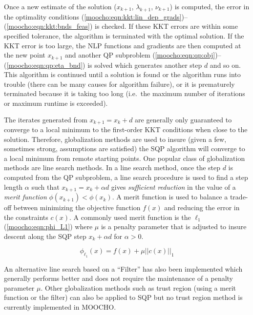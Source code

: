 \documentclass[pdf,12pt,report]{SANDreport}
\begin{document}
Once a new estimate of the solution ($x_{k+1}$, $\lambda_{k+1}$, $\nu_{k+1}$)
is computed, the error in the optimality conditions
(\ref{moocho:eqn:kkt:lin_dep_grads})--(\ref{moocho:eqn:kkt:bnds_feas}) is
checked.  If these KKT errors are within some specified tolerance, the
algorithm is terminated with the optimal solution.  If the KKT error is too
large, the NLP functions and gradients are then computed at the new point
$x_{k+1}$ and another QP subproblem
(\ref{moocho:eqn:qp:obj})--(\ref{moocho:eqn:qp:eta_bnd}) is solved which
generates another step $d$ and so on.  This algorithm is continued until a
solution is found or the algorithm runs into trouble (there can be many causes
for algorithm failure), or it is prematurely terminated because it is taking
too long (i.e.\ the maximum number of iterations or maximum runtime is
exceeded).

The iterates generated from $x_{k+1} = x_k + d$ are generally only guaranteed
to converge to a local minimum to the first-order KKT conditions when close to
the solution.  Therefore, globalization methods are used to insure (given a
few, sometimes strong, assumptions are satisfied) the SQP algorithm will
converge to a local minimum from remote starting points.  One popular class of
globalization methods are line search methods.  In a line search method, once
the step $d$ is computed from the QP subproblem, a line search procedure is
used to find a step length $\alpha$ such that $x_{k+1} = x_k + {}\alpha d$
gives {\em sufficient reduction} in the value of a {\em merit function}
$\phi(x_{k+1}) < \phi(x_k)$.  A merit function is used to balance a trade-off
between minimizing the objective function $f(x)$ and reducing the error in the
constraints $c(x)$.  A commonly used merit function is the $\ell_1$
(\ref{moocho:eqn:phi_L1}) where $\mu$ is a penalty parameter that is adjusted
to insure descent along the SQP step $x_k + \alpha d$ for $\alpha > 0$.

{\bsinglespace
\begin{equation}
\phi_{\ell_1}(x) = f(x) + \mu ||c(x)||_1
\label{moocho:eqn:phi_L1}
\end{equation}
\esinglespace}

An alternative line search based on a ``Filter'' has also been implemented
which generally performs better and does not require the maintenance of a
penalty parameter $\mu$.  Other globalization methods such as trust region
(using a merit function or the filter) can also be applied to SQP but no trust
region method is currently implemented in MOOCHO.
\end{document}
